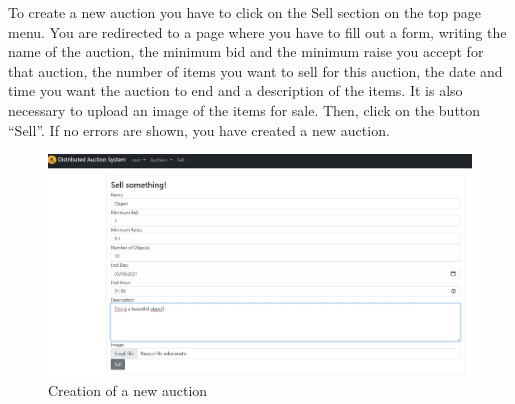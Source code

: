 To create a new auction you have to click on the Sell section on the top page
menu. You are redirected to a page where you have to fill out a form, writing
the name of the auction, the minimum bid and the minimum raise you accept for
that auction, the number of items you want to sell for this auction, the date
and time you want the auction to end and a description of the items. It is also
necessary to upload an image of the items for sale. Then, click on the button
``Sell''. If no errors are shown, you have created a new auction.

\begin{figure}[htb]
	\centering
	\includegraphics[width=\textwidth]{img/sell.jpg}
	\caption{Creation of a new auction}\label{fig:create-auction}
\end{figure}
